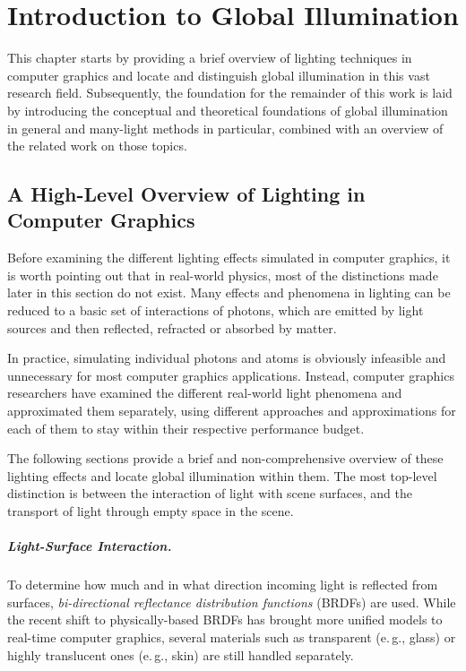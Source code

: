 
\chapter{Introduction to Global Illumination}
\label{chap:introductionGI}

This chapter starts by providing a brief overview of lighting techniques in computer graphics and locate and distinguish global illumination in this vast research field.
Subsequently, the foundation for the remainder of this work is laid by introducing the conceptual and theoretical foundations of global illumination in general and many-light methods in particular, combined with an overview of the related work on those topics.


\section{A High-Level Overview of Lighting in Computer Graphics}

Before examining the different lighting effects simulated in computer graphics, it is worth pointing out that in real-world physics, most of the distinctions made later in this section do not exist. Many effects and phenomena in lighting can be reduced to a basic set of interactions of photons, which are emitted by light sources and then reflected, refracted or absorbed by matter.

In practice, simulating individual photons and atoms is obviously infeasible and unnecessary for most computer graphics applications. Instead, computer graphics researchers have examined the different real-world light phenomena and approximated them separately, using different approaches and approximations for each of them to stay within their respective performance budget.

The following sections provide a brief and non-comprehensive overview of these lighting effects and locate global illumination within them. The most top-level distinction is between the interaction of light with scene surfaces, and the transport of light through empty space in the scene.

\paragraph{Light-Surface Interaction.}

To determine how much and in what direction incoming light is reflected from surfaces, \textit{bi-directional reflectance distribution functions} (BRDFs) are used. While the recent shift to physically-based BRDFs has brought more unified models to real-time computer graphics, several materials such as transparent (e.\,g., glass) or highly translucent ones (e.\,g., skin) are still handled separately.


